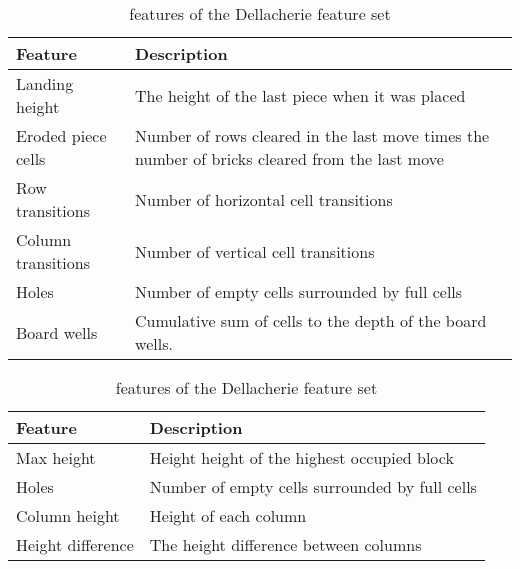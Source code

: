 \begin{table}[h!]
\begin{center}
\begin{tabular}{| l | p{8cm} |}
\hline
\textbf{Feature} & \textbf{Description}\\
\hline
Landing height & The height of the last piece when it was placed\\
\hline
Eroded piece cells & Number of rows cleared in the last move
times the number of bricks cleared from the last move\\
\hline
Row transitions & Number of horizontal cell transitions\\
\hline
Column transitions & Number of vertical cell transitions \\
\hline
Holes & Number of empty cells surrounded by full cells\\
\hline
Board wells & Cumulative sum of cells to the depth of
the board wells.\\
\hline
\end{tabular}
\end{center}
\caption{features of the Dellacherie feature set \label{table:dellfeat}}
\end{table}

\begin{table}[h!]
\begin{center}
\begin{tabular}{| l | p{8cm} |}
\hline
\textbf{Feature} & \textbf{Description}\\
\hline
Max height & Height height of the highest occupied block\\
\hline
Holes & Number of empty cells surrounded by full cells\\
\hline
Column height & Height of each column\\
\hline
Height difference & The height difference between columns\\
\hline
\end{tabular}
\end{center}
\caption{features of the Dellacherie feature set \label{table:bertfeat}}
\end{table}


